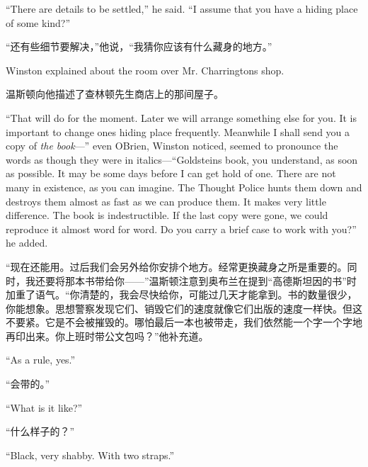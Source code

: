 \begin{paracol}{2}
\switchcolumn*

``There are details to be settled,'' he said. ``I assume that you have a
hiding place of some kind?''

\switchcolumn

``还有些细节要解决，''他说，``我猜你应该有什么藏身的地方。''

\switchcolumn*

Winston explained about the room over Mr. Charrington\textquotesingle s
shop.

\switchcolumn

温斯顿向他描述了查林顿先生商店上的那间屋子。

\switchcolumn*

``That will do for the moment. Later we will arrange something else for
you. It is important to change one\textquotesingle s hiding place
frequently. Meanwhile I shall send you a copy of \emph{the book}---''
even O\textquotesingle Brien, Winston noticed, seemed to pronounce the
words as though they were in italics---``Goldstein\textquotesingle s
book, you understand, as soon as possible. It may be some days before I
can get hold of one. There are not many in existence, as you can
imagine. The Thought Police hunts them down and destroys them almost as
fast as we can produce them. It makes very little difference. The book
is indestructible. If the last copy were gone, we could reproduce it
almost word for word. Do you carry a brief case to work with you?'' he
added.

\switchcolumn

``现在还能用。过后我们会另外给你安排个地方。经常更换藏身之所是重要的。同时，我还要将那本书带给你——''温斯顿注意到奥布兰在提到``高德斯坦因的书''时加重了语气。``你清楚的，我会尽快给你，可能过几天才能拿到。书的数量很少，你能想象。思想警察发现它们、销毁它们的速度就像它们出版的速度一样快。但这不要紧。它是不会被摧毁的。哪怕最后一本也被带走，我们依然能一个字一个字地再印出来。你上班时带公文包吗？''他补充道。

\switchcolumn*

``As a rule, yes.''

\switchcolumn

``会带的。''

\switchcolumn*

``What is it like?''

\switchcolumn

``什么样子的？''

\switchcolumn*

``Black, very shabby. With two straps.''


\end{paracol}
